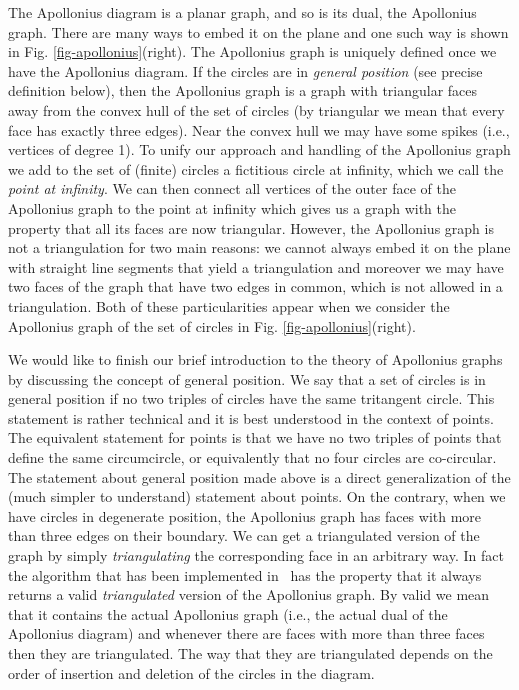 The Apollonius diagram is a planar graph, and so is its dual, the
Apollonius graph. There are many ways to embed it on the plane and one
such way is shown in Fig. \ref{fig-apollonius}(right).
The Apollonius graph is uniquely defined once we have
the Apollonius diagram. If the circles are in {\em general position}
(see precise definition below), then the Apollonius graph is a graph
with triangular faces away from 
the convex hull of the set of circles (by triangular we mean that
every face has exactly three edges). Near the convex hull we may
have some spikes (i.e., vertices of degree 1). To unify our approach
and handling of the Apollonius graph we add to the set of (finite)
circles a fictitious circle at infinity, which we call the
{\em point at infinity}. We can then connect all vertices of the outer
face of the Apollonius graph to the point at infinity which gives us
a graph with the property that all its faces are now
triangular. However, the Apollonius graph is not a triangulation for
two main reasons: we cannot always embed it on the plane with straight
line segments that yield a triangulation and moreover we may have two
faces of the graph that have two edges in common, which is not allowed
in a triangulation. Both of these particularities appear when we
consider the Apollonius graph of the set of circles in
Fig. \ref{fig-apollonius}(right).


We would like to finish our brief introduction to the theory of
Apollonius graphs by discussing the concept of general position. We say
that a set of circles is in general position if no two triples of
circles have the same tritangent circle. This statement is rather
technical and it is best understood in the context of points. The
equivalent statement for points is that we have no two triples of
points that define the same circumcircle, or equivalently that no
four circles are co-circular. The statement about general position made
above is a direct generalization of the (much simpler to understand)
statement about points. On the contrary, when we have circles in
degenerate position, the Apollonius graph has faces with more than
three edges on their boundary. We can get a triangulated version of
the graph by simply {\em triangulating} the corresponding face in an
arbitrary way. In fact the algorithm that has been implemented in
\cgal\ has the property that it always returns a valid
{\em triangulated} version of the Apollonius graph. By valid we mean
that it contains the actual Apollonius graph (i.e., the actual dual of
the Apollonius diagram) and whenever there are faces with more than
three faces then they are triangulated. The way that they are
triangulated depends on the order of insertion and deletion of the
circles in the diagram.



